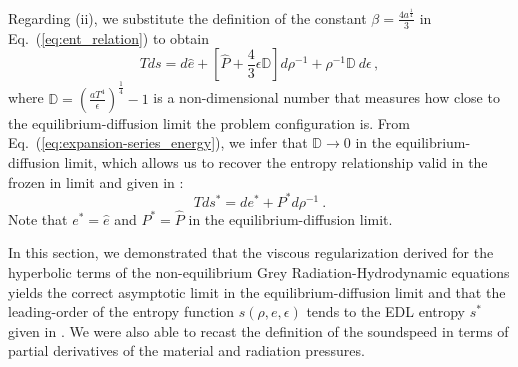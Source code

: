 \documentclass[review]{elsarticle}
\newcommand{\eqt}[1]{Eq.~(\ref{#1})}                     %
\begin{document}
Regarding (ii), we substitute the definition of the constant $\beta = \frac{4a^\frac{1}{4}}{3}$ in \eqt{eq:ent_relation} to obtain
%
\begin{equation}\label{eq:ent_relation2}
Tds = d\hat{e} + \left[ \hat{P} + \frac{4}{3}\epsilon \mathbb{D} \right] d \rho^{-1} + \rho^{-1}\mathbb{D} \ d \epsilon \,,
\end{equation}
%
where $\mathbb{D} = \left(\frac{aT^4}{\epsilon}\right)^\frac{1}{4}-1$ is a non-dimensional number that measures how close to the equilibrium-diffusion limit the problem configuration is. From \eqt{eq:expansion-series_energy}, we infer that $\mathbb{D} \to 0$ in the equilibrium-diffusion limit, which allows us to recover the entropy relationship valid in the frozen in limit and given in \cite{LowrieMorel}:
%
\begin{equation}
Tds^* = de^* + P^*d \rho^{-1} \ .
\end{equation}
%
Note that $e^* = \hat{e}$ and $P^* = \hat{P}$ in the equilibrium-diffusion limit.
 
In this section, we demonstrated that the viscous regularization derived for the hyperbolic terms of the non-equilibrium Grey Radiation-Hydrodynamic equations yields the correct asymptotic limit in the equilibrium-diffusion limit and that the leading-order  of the entropy function $s(\rho, e, \epsilon)$ tends to the EDL entropy $s^*$ given in \cite{LowrieMorel}. We were also able to recast the definition of the soundspeed in terms of partial derivatives of the material and radiation pressures.
%
\end{document}
